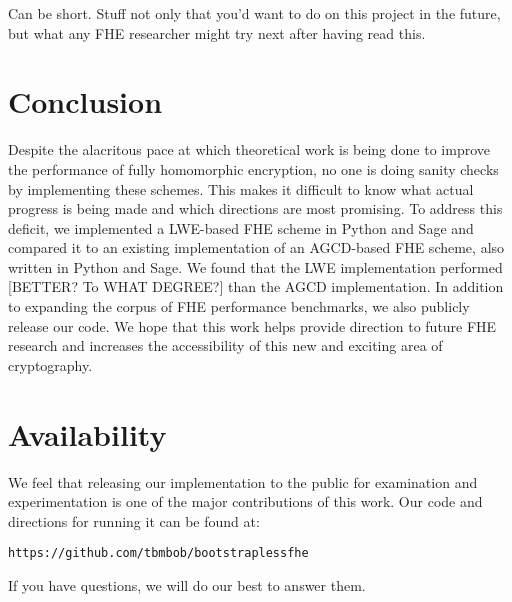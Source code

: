\documentclass[letterpaper,twocolumn,10pt]{article}
\begin{document}
Can be short. Stuff not only that you'd want to do on this project in the future, but what any FHE researcher might try next after having read this.


\section{Conclusion}
Despite the alacritous pace at which theoretical work is being done to improve the performance of fully homomorphic encryption, no one is doing sanity checks by implementing these schemes. This makes it difficult to know what actual progress is being made and which directions are most promising. To address this deficit, we implemented a LWE-based FHE scheme in Python and Sage and compared it to an existing implementation of an AGCD-based FHE scheme, also written in Python and Sage. We found that the LWE implementation performed [BETTER? To WHAT DEGREE?] than the AGCD implementation. In addition to expanding the corpus of FHE performance benchmarks, we also publicly release our code. We hope that this work helps provide direction to future FHE research and increases the accessibility of this new and exciting area of cryptography.


\section{Availability}
We feel that releasing our implementation to the public for examination and experimentation is one of the major contributions of this work. Our code and directions for running it can be found at:

\begin{center}
{\tt https://github.com/tbmbob/bootstraplessfhe}\\
\end{center}

If you have questions, we will do our best to answer them.
\end{document}
